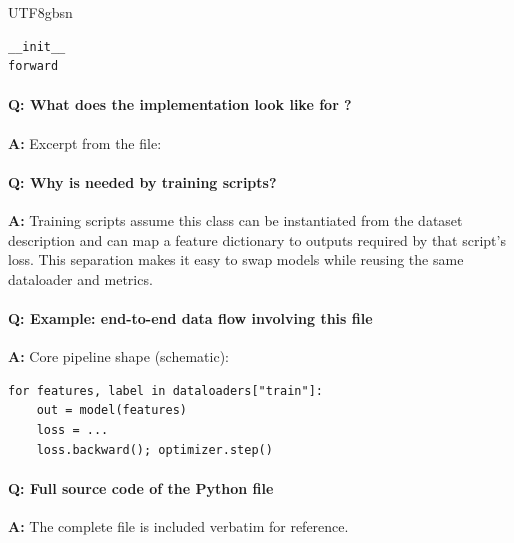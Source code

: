 \documentclass[11pt]{article}
\begin{document}
\begin{CJK*}{UTF8}{gbsn}
\begin{Verbatim}[fontsize=\small]
__init__
forward
\end{Verbatim}

\paragraph{Q: What does the implementation look like for \texttt{}?}
\textbf{A:} Excerpt from the file:

\vspace{1mm}


\paragraph{Q: Why is \texttt{} needed by training scripts?}
\textbf{A:} Training scripts assume this class can be instantiated from the dataset description and can map a feature dictionary to outputs required by that script's loss. This separation makes it easy to swap models while reusing the same dataloader and metrics.

\paragraph{Q: Example: end-to-end data flow involving this file}
\textbf{A:} Core pipeline shape (schematic):

\begin{Verbatim}[fontsize=\small]
for features, label in dataloaders["train"]:
    out = model(features)
    loss = ...
    loss.backward(); optimizer.step()
\end{Verbatim}

\paragraph{Q: Full source code of the Python file}
\textbf{A:} The complete file is included verbatim for reference.


\end{CJK*}
\end{document}
